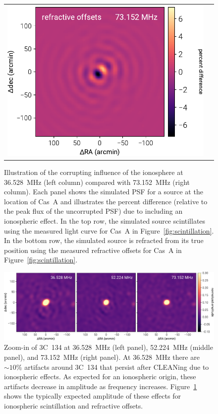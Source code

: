 \documentclass[twocolumn]{aastex61}
\begin{document}
\begin{figure}[t]
\begin{tabular}{cc}
        \includegraphics[width=\columnwidth]{figures/ionospheric-simulations/refraction-18} \\
    \end{tabular}
    \caption{
        Illustration of the corrupting influence of the ionosphere at 36.528~MHz (left column)
        compared with 73.152~MHz (right column). Each panel shows the simulated PSF for a source at
        the location of Cas~A and illustrates the percent difference (relative to the peak flux of
        the uncorrupted PSF) due to including an ionospheric effect.  In the top row, the simulated
        source scintillates using the measured light curve for Cas~A in
        Figure~\ref{fig:scintillation}. In the bottom row, the simulated source is refracted from
        its true position using the measured refractive offsets for Cas~A in
        Figure~\ref{fig:scintillation}.
    }
    \label{fig:ionospheric-simulations}
\end{figure}

\begin{figure}[t]
    \centering
    \includegraphics[width=\textwidth]{figures/postage-stamps/3C134}
    \caption{
        Zoom-in of 3C~134 at 36.528~MHz (left panel), 52.224~MHz (middle panel), and 73.152~MHz
        (right panel). At 36.528~MHz there are $\sim10\%$ artifacts around 3C~134 that persist after
        CLEANing due to ionospheric effects. As expected for an ionospheric origin, these artifacts
        decrease in amplitude as frequency increases. Figure~\ref{fig:ionospheric-simulations} shows
        the typically expected amplitude of these effects for ionospheric scintillation and
        refractive offsets.
    }
    \label{fig:3C134}
\end{figure}
\end{document}
